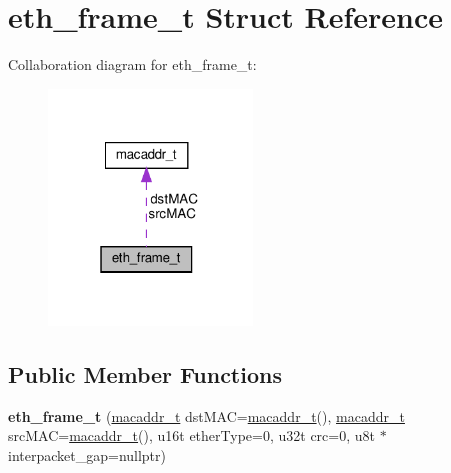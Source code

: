 \hypertarget{structeth__frame__t}{}\section{eth\+\_\+frame\+\_\+t Struct Reference}
\label{structeth__frame__t}


Collaboration diagram for eth\+\_\+frame\+\_\+t\+:\nopagebreak
\begin{figure}[H]
\begin{center}
\leavevmode
\includegraphics[width=154pt]{structeth__frame__t__coll__graph}
\end{center}
\end{figure}
\subsection*{Public Member Functions}
\begin{DoxyCompactItemize}
\item 
\mbox{\label{structeth__frame__t_a8617affa4463b4e4b29484ddc6704ae1}} 
{\bfseries eth\+\_\+frame\+\_\+t} (\hyperlink{structmacaddr__t}{macaddr\+\_\+t} dst\+M\+AC=\hyperlink{structmacaddr__t}{macaddr\+\_\+t}(), \hyperlink{structmacaddr__t}{macaddr\+\_\+t} src\+M\+AC=\hyperlink{structmacaddr__t}{macaddr\+\_\+t}(), u16t ether\+Type=0, u32t crc=0, u8t $\ast$interpacket\+\_\+gap=nullptr)
\end{DoxyCompactItemize}
